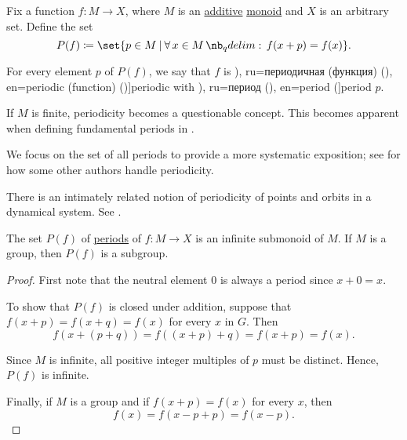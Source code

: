 \begin{definition}\label{def:periodic_function}\mimprovised
  Fix a function \( f: M \to X \), where \( M \) is an  \hyperref[con:additive_semigroup]{additive} \hyperref[def:monoid]{monoid} and \( X \) is an arbitrary set. Define the set
  \begin{equation*}
    P(f) \coloneqq \set{ p \in M \given \qforall* {x \in M} f(x + p) = f(x) }.
  \end{equation*}

  For every  element \( p \) of \( P(f) \), we say that \( f \) is \term[bg=периодична (функция) (\cite[318]{ИлинСадовничиСендов1989АнализТом2}), ru=периодичная (функция) (\cite[371]{Фихтенгольц1968ОсновыАнализаТом2}), en=periodic (function) (\cite[def. 5.1.1]{Tao2022AnalysisII})]{periodic} with \term[bg=период (\cite[318]{ИлинСадовничиСендов1989АнализТом2}), ru=период (\cite[371]{Фихтенгольц1968ОсновыАнализаТом2}), en=period (\cite[def. 8.3]{LidlNiederreiter1997FiniteFields}]{period} \( p \).
\end{definition}
\begin{comments}
  \item If \( M \) is finite, periodicity becomes a questionable concept. This becomes apparent when defining fundamental periods in .

  \item We focus on the set of all periods to provide a more systematic exposition; see  for how some other authors handle periodicity.

  \item There is an intimately related notion of periodicity of points and orbits in a dynamical system. See .
\end{comments}

\begin{proposition}\label{thm:monoid_of_function_periods}
  The set \( P(f) \) of \hyperref[def:periodic_function]{periods} of \( f: M \to X \) is an infinite submonoid of \( M \). If \( M \) is a group, then \( P(f) \) is a subgroup.
\end{proposition}
\begin{proof}
  First note that the neutral element \( 0 \) is always a period since \( x + 0 = x \).

  To show that \( P(f) \) is closed under addition, suppose that \( f(x + p) = f(x + q) = f(x) \) for every \( x \) in \( G \). Then
  \begin{equation*}
    f(x + (p + q)) = f((x + p) + q) = f(x + p) = f(x).
  \end{equation*}

  Since \( M \) is infinite, all positive integer multiples of \( p \) must be distinct. Hence, \( P(f) \) is infinite.

  Finally, if \( M \) is a group and if \( f(x + p) = f(x) \) for every \( x \), then
  \begin{equation*}
    f(x) = f(x - p + p) = f(x - p).
  \end{equation*}
\end{proof}

